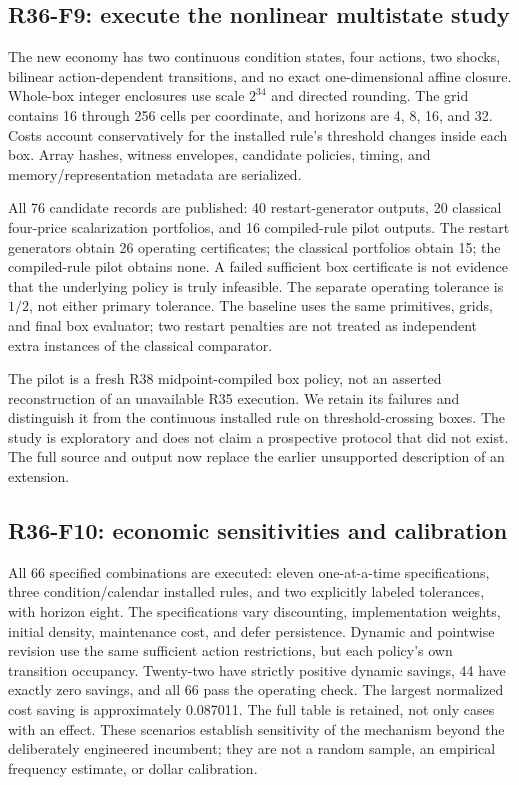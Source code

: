 \subsection{R36-F9: execute the nonlinear multistate study}
The new economy has two continuous condition states, four actions, two shocks, bilinear action-dependent transitions, and no exact one-dimensional affine closure. Whole-box integer enclosures use scale $2^{34}$ and directed rounding. The grid contains 16 through 256 cells per coordinate, and horizons are 4, 8, 16, and 32. Costs account conservatively for the installed rule's threshold changes inside each box. Array hashes, witness envelopes, candidate policies, timing, and memory/representation metadata are serialized.

All 76 candidate records are published: 40 restart-generator outputs, 20 classical four-price scalarization portfolios, and 16 compiled-rule pilot outputs. The restart generators obtain 26 operating certificates; the classical portfolios obtain 15; the compiled-rule pilot obtains none. A failed sufficient box certificate is not evidence that the underlying policy is truly infeasible. The separate operating tolerance is $1/2$, not either primary tolerance. The baseline uses the same primitives, grids, and final box evaluator; two restart penalties are not treated as independent extra instances of the classical comparator.

The pilot is a fresh R38 midpoint-compiled box policy, not an asserted reconstruction of an unavailable R35 execution. We retain its failures and distinguish it from the continuous installed rule on threshold-crossing boxes. The study is exploratory and does not claim a prospective protocol that did not exist. The full source and output now replace the earlier unsupported description of an extension.

\subsection{R36-F10: economic sensitivities and calibration}
All 66 specified combinations are executed: eleven one-at-a-time specifications, three condition/calendar installed rules, and two explicitly labeled tolerances, with horizon eight. The specifications vary discounting, implementation weights, initial density, maintenance cost, and defer persistence. Dynamic and pointwise revision use the same sufficient action restrictions, but each policy's own transition occupancy. Twenty-two have strictly positive dynamic savings, 44 have exactly zero savings, and all 66 pass the operating check. The largest normalized cost saving is approximately 0.087011. The full table is retained, not only cases with an effect. These scenarios establish sensitivity of the mechanism beyond the deliberately engineered incumbent; they are not a random sample, an empirical frequency estimate, or dollar calibration.

